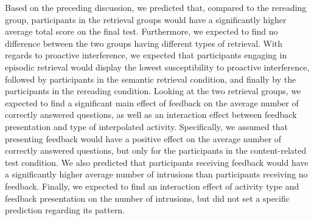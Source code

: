 \documentclass[../main.tex]{subfiles}
\begin{document}
Based on the preceding discussion, we predicted that, compared to the rereading 
group, participants in the retrieval groups would have a significantly higher 
average total score on the final test. Furthermore, we expected to find no 
difference between the two groups having different types of retrieval. With 
regards to proactive interference, we expected that participants engaging 
in episodic retrieval would display the lowest susceptibility to proactive 
interference, followed by participants in the semantic retrieval condition, and 
finally by the participants in the rereading condition. Looking at the two 
retrieval groups, we expected to find a significant main effect of feedback on 
the average number of correctly answered questions, as well as an interaction 
effect between feedback presentation and type of interpolated activity. 
Specifically, we assumed that presenting feedback would have a positive effect 
on the average number of correctly answered questions, but only for the 
participants in the content-related test condition. We also predicted that 
participants receiving feedback would have a significantly higher average 
number of intrusions than participants receiving no feedback. Finally, we 
expected to find an interaction effect of activity type and feedback 
presentation on the number of intrusions, but did not set a specific prediction 
regarding its pattern.
 
{
	\biblio
}
\end{document}
